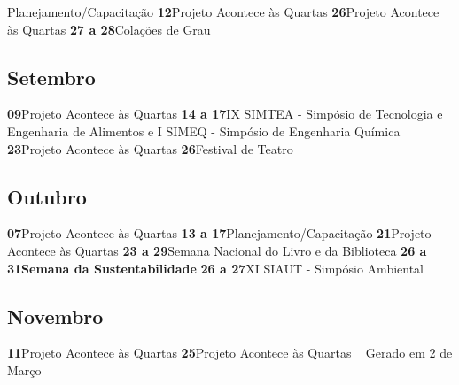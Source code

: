 \documentclass[thesis]{hmcposter}
\begin{document}
\begin{poster}
Planejamento/Capacitação \newline\textbf{12}\quad \quad \quad \quad Projeto Acontece às Quartas \newline\textbf{26}\quad \quad \quad \quad Projeto Acontece às Quartas \newline\textbf{27 a 28}\quad \quad Colações de Grau \newline\subsection{Setembro}\textbf{09}\quad \quad \quad \quad Projeto Acontece às Quartas \newline\textbf{14 a 17}\quad \quad IX SIMTEA - Simpósio de Tecnologia e Engenharia de Alimentos  e I SIMEQ - Simpósio de Engenharia Química \newline\textbf{23}\quad \quad \quad \quad Projeto Acontece às Quartas \newline\textbf{26}\quad \quad \quad \quad Festival de Teatro \newline\subsection{Outubro}\textbf{07}\quad \quad \quad \quad Projeto Acontece às Quartas \newline\textbf{13 a 17}\quad \quad Planejamento/Capacitação \newline\textbf{21}\quad \quad \quad \quad Projeto Acontece às Quartas \newline\textbf{23 a 29}\quad \quad  Semana Nacional do Livro e da Biblioteca \newline\textbf{26 a 31}\quad \quad \textbf{Semana da Sustentabilidade} \newline\textbf{26 a 27}\quad \quad XI SIAUT - Simpósio Ambiental \newline\subsection{Novembro}\textbf{11}\quad \quad \quad \quad Projeto Acontece às Quartas \newline\textbf{25}\quad \quad \quad \quad Projeto Acontece às Quartas \newline ~ \vfill \hfill \small \color{hmcorange}Gerado em 2 de Março \end{poster}
\end{document}

